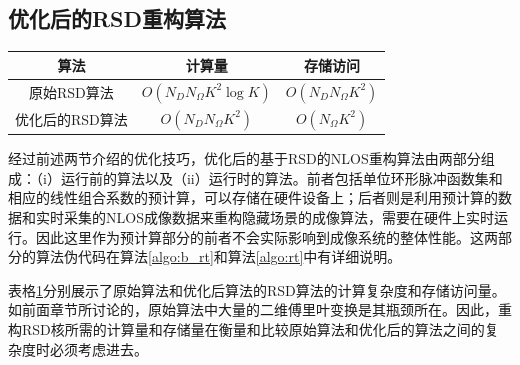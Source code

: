 \documentclass[master]{shtthesis}             %
\begin{document}
\subsection{优化后的RSD重构算法}\label{sec:opt_algo}

\begin{table}[!t]
    \centering
    \label{tab:fuzadu_comp}
        \begin{tabular}{@{}ccc@{}}
            \toprule
            算法               & 计算量 & 存储访问 \\ \midrule
            原始RSD算法 & $O(N_DN_{\Omega}K^2\log K)$          & $O(N_DN_{\Omega}K^2)$             \\
            优化后的RSD算法& $O(N_DN_{\Omega}K^2)$              & $O(N_{\Omega}K^2)$             \\ \bottomrule
        \end{tabular}%
\end{table}

经过前述两节介绍的优化技巧，优化后的基于RSD的NLOS重构算法由两部分组成：（i）运行前的算法以及（ii）运行时的算法。前者包括单位环形脉冲函数集和相应的线性组合系数的预计算，可以存储在硬件设备上；后者则是利用预计算的数据和实时采集的NLOS成像数据来重构隐藏场景的成像算法，需要在硬件上实时运行。因此这里作为预计算部分的前者不会实际影响到成像系统的整体性能。这两部分的算法伪代码在算法\ref{algo:b_rt}和算法\ref{algo:rt}中有详细说明。

表格\ref{tab:fuzadu_comp}分别展示了原始算法和优化后算法的RSD算法的计算复杂度和存储访问量。如前面章节所讨论的，原始算法中大量的二维傅里叶变换是其瓶颈所在。因此，重构RSD核所需的计算量和存储量在衡量和比较原始算法和优化后的算法之间的复杂度时必须考虑进去。
\end{document}
